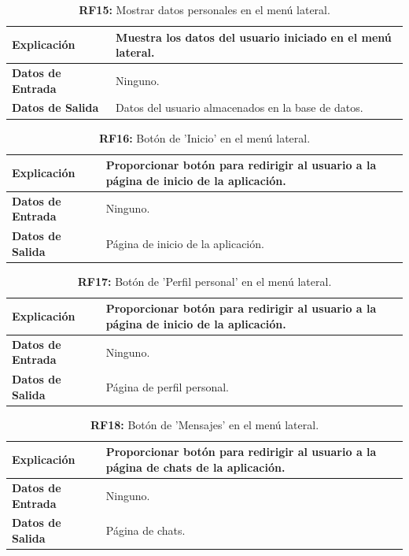 \documentclass[a4paper, 12pt]{article}
\begin{document}
\begin{table}[H]
\captionsetup{justification=raggedright,singlelinecheck=false}
\caption{\textbf{RF15:} Mostrar datos personales en el menú lateral.}
\label{tab:RF15}
	\begin{tabular}{|m{5cm}|m{10cm}|}
	\hline
	\textbf{Explicación} & Muestra los datos del usuario iniciado en el menú lateral. \\ 
	\hline
	\textbf{Datos de Entrada} & Ninguno. \\ 
	\hline
	\textbf{Datos de Salida} & Datos del usuario almacenados en la base de datos. \\ 
	\hline
\end{tabular}
\end{table}

\begin{table}[H]
\captionsetup{justification=raggedright,singlelinecheck=false}
\caption{\textbf{RF16:} Botón de 'Inicio' en el menú lateral.}
\label{tab:RF16}
	\begin{tabular}{|m{5cm}|m{10cm}|}
	\hline
	\textbf{Explicación} & Proporcionar botón para redirigir al usuario a la página de inicio de la aplicación. \\ 
	\hline
	\textbf{Datos de Entrada} &  Ninguno. \\ 
	\hline
	\textbf{Datos de Salida} &  Página de inicio de la aplicación. \\ 
	\hline
\end{tabular}
\end{table}

\begin{table}[H]
\captionsetup{justification=raggedright,singlelinecheck=false}
\caption{\textbf{RF17:} Botón de 'Perfil personal' en el menú lateral.}
\label{tab:RF17}
	\begin{tabular}{|m{5cm}|m{10cm}|}
	\hline
	\textbf{Explicación} & Proporcionar botón para redirigir al usuario a la página de inicio de la aplicación. \\ 
	\hline
	\textbf{Datos de Entrada} &  Ninguno. \\ 
	\hline
	\textbf{Datos de Salida} &  Página de perfil personal. \\ 
	\hline
	\hline
\end{tabular}
\end{table}

\begin{table}[H]
\captionsetup{justification=raggedright,singlelinecheck=false}
\caption{\textbf{RF18:} Botón de 'Mensajes' en el menú lateral.}
\label{tab:RF18}
	\begin{tabular}{|m{5cm}|m{10cm}|}
	\hline
	\textbf{Explicación} & Proporcionar botón para redirigir al usuario a la página de chats de la aplicación. \\ 
	\hline
	\textbf{Datos de Entrada} &  Ninguno. \\ 
	\hline
	\textbf{Datos de Salida} &  Página de chats. \\ 
	\hline
\end{tabular}
\end{table}
\end{document}
